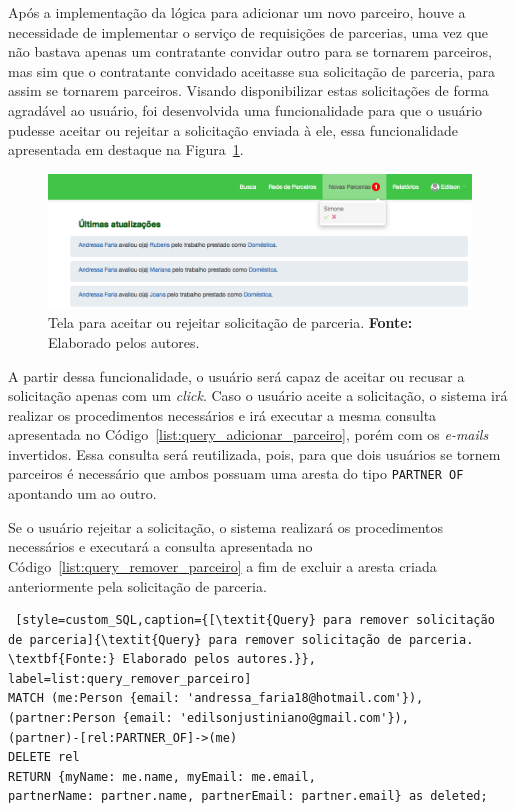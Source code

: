 \par Após a implementação da lógica para adicionar um novo parceiro, houve a necessidade de implementar o serviço de requisições de parcerias, uma vez que não bastava apenas um contratante convidar outro para se tornarem parceiros, mas sim que o contratante convidado aceitasse sua solicitação de parceria, para assim se tornarem parceiros. Visando disponibilizar estas solicitações de forma agradável ao usuário, foi desenvolvida uma funcionalidade para que o usuário pudesse aceitar ou rejeitar a solicitação enviada à ele, essa funcionalidade apresentada em destaque na Figura~\ref{fig:aceitar_rejeitar_solicitacao_parceria}.

\begin{figure}[h!]
	\centerline{\includegraphics[scale=0.45]{./imagens/aceitar_rejeitar_solicitacao_parceria.png}}
	\caption[Tela para aceitar ou rejeitar solicitação de parceria]
	{Tela para aceitar ou rejeitar solicitação de parceria. \textbf{Fonte:} Elaborado pelos autores.}
	\label{fig:aceitar_rejeitar_solicitacao_parceria}
\end{figure}

\par A partir dessa funcionalidade, o usuário será capaz de aceitar ou recusar a solicitação apenas com um \textit{click}. Caso o usuário aceite a solicitação, o sistema irá realizar os procedimentos necessários e irá executar a mesma consulta apresentada no Código~\ref{list:query_adicionar_parceiro}, porém com os \textit{e-mails} invertidos. Essa consulta será reutilizada, pois, para que dois usuários se tornem parceiros é necessário que ambos possuam uma aresta do tipo \texttt{PARTNER OF} apontando um ao outro.

\par Se o usuário rejeitar a solicitação, o sistema realizará os procedimentos necessários e executará a consulta apresentada no Código~\ref{list:query_remover_parceiro} a fim de excluir a aresta criada anteriormente pela solicitação de parceria.

\begin{lstlisting} [style=custom_SQL,caption={[\textit{Query} para remover solicitação de parceria]{\textit{Query} para remover solicitação de parceria. \textbf{Fonte:} Elaborado pelos autores.}}, label=list:query_remover_parceiro] 	
MATCH (me:Person {email: 'andressa_faria18@hotmail.com'}),
(partner:Person {email: 'edilsonjustiniano@gmail.com'}),
(partner)-[rel:PARTNER_OF]->(me)
DELETE rel
RETURN {myName: me.name, myEmail: me.email, 
partnerName: partner.name, partnerEmail: partner.email} as deleted;
\end{lstlisting}


